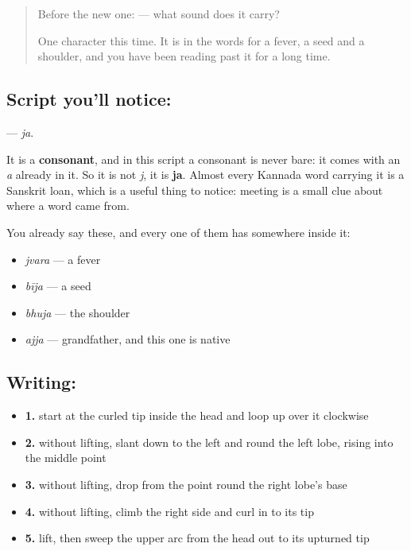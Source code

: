 \label{lesson:KA-S150-letter-ja}



\begin{quote}
Before the new one:  — what sound does it carry?

One character this time. It is in the words for a fever, a seed and a shoulder, and you have been reading past it for a long time.
\end{quote}

\subsection*{Script you'll notice: }
\textbf{} — \emph{ja}.

It is a \textbf{consonant}, and in this script a consonant is never bare: it comes with an \emph{a} already in it. So it is not \emph{j}, it is \textbf{ja}. Almost every Kannada word carrying it is a Sanskrit loan, which is a useful thing to notice: meeting  is a small clue about where a word came from.

You already say these, and every one of them has  somewhere inside it:

\begin{itemize}
\raggedright
  \item \textbf{} \emph{jvara} — a fever
  \item \textbf{} \emph{bīja} — a seed
  \item \textbf{} \emph{bhuja} — the shoulder
  \item \textbf{} \emph{ajja} — grandfather, and this one is native
\end{itemize}

\subsection*{Writing: }

\begin{itemize}
\raggedright
  \item \textbf{1.} start at the curled tip inside the head and loop up over it clockwise
  \item \textbf{2.} without lifting, slant down to the left and round the left lobe, rising into the middle point
  \item \textbf{3.} without lifting, drop from the point round the right lobe's base
  \item \textbf{4.} without lifting, climb the right side and curl in to its tip
  \item \textbf{5.} lift, then sweep the upper arc from the head out to its upturned tip
\end{itemize}


